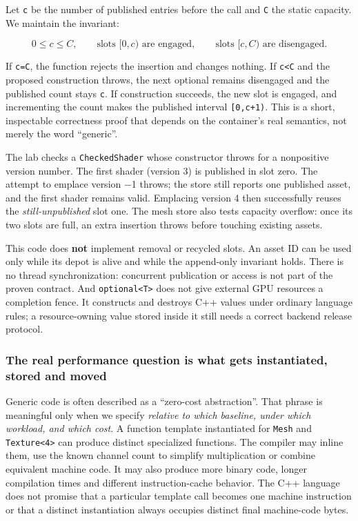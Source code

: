 Let \texttt{c} be the number of published entries before the call and \texttt{C} the static capacity. We maintain the invariant:

\[
0\le c\le C,\qquad
\text{slots }[0,c)\text{ are engaged},\qquad
\text{slots }[c,C)\text{ are disengaged}.
\]

If \texttt{c=C}, the function rejects the insertion and changes nothing. If \texttt{c\textless{}C} and the proposed construction throws, the next optional remains disengaged and the published count stays \texttt{c}. If construction succeeds, the new slot is engaged, and incrementing the count makes the published interval \texttt{{[}0,c+1)}. This is a short, inspectable correctness proof that depends on the container's real semantics, not merely the word ``generic''.

The lab checks a \texttt{CheckedShader} whose constructor throws for a nonpositive version number. The first shader (version 3) is published in slot zero. The attempt to emplace version −1 throws; the store still reports one published asset, and the first shader remains valid. Emplacing version 4 then successfully reuses the \emph{still-unpublished} slot one. The mesh store also tests capacity overflow: once its two slots are full, an extra insertion throws before touching existing assets.

This code does \textbf{not} implement removal or recycled slots. An asset ID can be used only while its depot is alive and while the append-only invariant holds. There is no thread synchronization: concurrent publication or access is not part of the proven contract. And \texttt{optional\textless{}T\textgreater{}} does not give external GPU resources a completion fence. It constructs and destroys C++ values under ordinary language rules; a resource-owning value stored inside it still needs a correct backend release protocol.

\subsubsection{The real performance question is what gets instantiated, stored and moved}\label{the-real-performance-question-is-what-gets-instantiated-stored-and-moved}

Generic code is often described as a ``zero-cost abstraction''. That phrase is meaningful only when we specify \emph{relative to which baseline, under which workload, and which cost}. A function template instantiated for \texttt{Mesh} and \texttt{Texture\textless{}4\textgreater{}} can produce distinct specialized functions. The compiler may inline them, use the known channel count to simplify multiplication or combine equivalent machine code. It may also produce more binary code, longer compilation times and different instruction-cache behavior. The C++ language does not promise that a particular template call becomes one machine instruction or that a distinct instantiation always occupies distinct final machine-code bytes.


